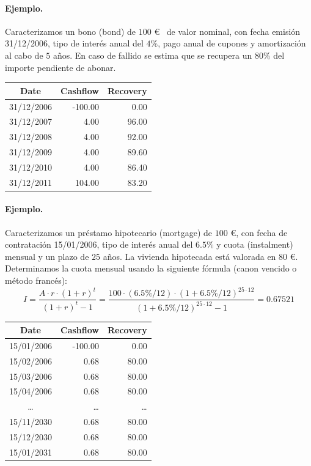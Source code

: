 \paragraph{Ejemplo.}
Caracterizamos un bono (bond) de $100$ \euro~ de valor nominal, con fecha emisi\'on
31/12/2006, tipo de inter\'es anual del $4\%$, pago anual de cupones y amortizaci\'on
al cabo de $5$ a\~nos. En caso de fallido se estima que se recupera un $80\%$ del
importe pendiente de abonar.\newline

\begin{center}
\begin{tabular}{c|r|r}
\textbf{Date} & \textbf{Cashflow} & \textbf{Recovery} \\
\hline
31/12/2006 &  -100.00 &    0.00 \\
31/12/2007 &     4.00 &   96.00 \\
31/12/2008 &     4.00 &   92.00 \\
31/12/2009 &     4.00 &   89.60 \\
31/12/2010 &     4.00 &   86.40 \\
31/12/2011 &   104.00 &   83.20
\end{tabular}
\end{center}

\paragraph{Ejemplo.}
Caracterizamos un pr\'estamo hipotecario (mortgage) de $100$ \euro, con fecha
de contrataci\'on 15/01/2006, tipo de inter\'es anual del $6.5\%$ y cuota
(instalment) mensual y un plazo de $25$ a\~nos. La vivienda hipotecada est\'a
valorada en $80$ \euro. Determinamos la cuota mensual usando la siguiente
f\'ormula (canon vencido o m\'etodo franc\'es):
\begin{displaymath}
I =
\frac{A \cdot r \cdot (1+r)^t}{(1+r)^t - 1} =
\frac{100 \cdot (6.5\%/12) \cdot (1+6.5\%/12)^{25\cdot12}}{(1+6.5\%/12)^{25\cdot12} - 1} =
0.67521
\end{displaymath}

\begin{center}
\begin{tabular}{c|r|r}
\textbf{Date} & \textbf{Cashflow} & \textbf{Recovery} \\
\hline
15/01/2006 &  -100.00 &    0.00 \\
15/02/2006 &     0.68 &   80.00 \\
15/03/2006 &     0.68 &   80.00 \\
15/04/2006 &     0.68 &   80.00 \\
\dots      &    \dots &   \dots \\
15/11/2030 &     0.68 &   80.00 \\
15/12/2030 &     0.68 &   80.00 \\
15/01/2031 &     0.68 &   80.00
\end{tabular}
\end{center}

